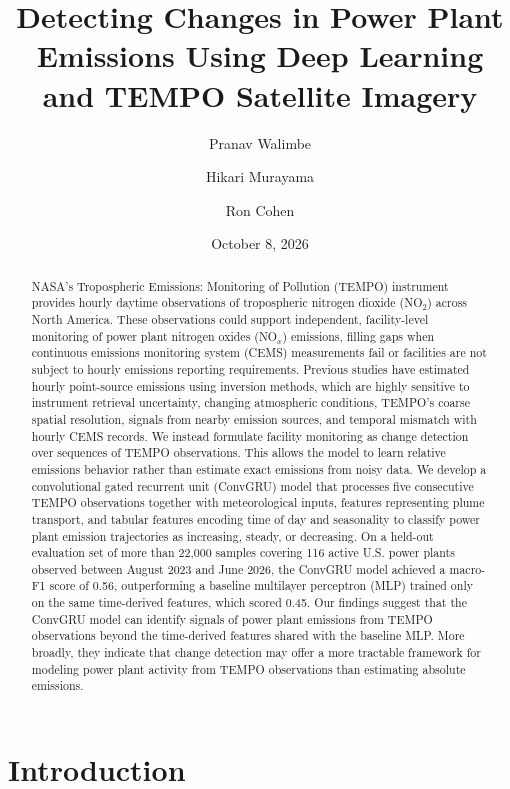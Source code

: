 \documentclass[sigconf,nonacm]{acmart}
\title{Detecting Changes in Power Plant \texorpdfstring{\NOx}{NOx} Emissions Using
Deep Learning and TEMPO Satellite Imagery}
\author{Pranav Walimbe}
\affiliation{%
  \institution{University of California, Berkeley}
  \city{Berkeley}
  \state{California}
  \country{USA}
}
\author{Hikari Murayama}
\affiliation{%
  \institution{University of California, Berkeley}
  \city{Berkeley}
  \state{California}
  \country{USA}
}
\author{Ron Cohen}
\affiliation{%
  \institution{University of California, Berkeley}
  \city{Berkeley}
  \state{California}
  \country{USA}
}
\date{October 8, 2026}
\newcommand{\NOx}{NO$_x$}
\begin{document}
\begin{abstract}
NASA's Tropospheric Emissions: Monitoring of Pollution (TEMPO) instrument
provides hourly daytime observations of tropospheric nitrogen dioxide
(NO$_2$) across North America. These observations could support independent,
facility-level monitoring of power plant nitrogen oxides (\NOx{}) emissions,
filling gaps when continuous emissions monitoring system (CEMS) measurements fail
or facilities are not subject to hourly emissions reporting requirements.
Previous studies have estimated hourly point-source emissions
using inversion methods, which are highly sensitive to instrument
retrieval uncertainty, changing atmospheric conditions, TEMPO's coarse spatial
resolution, signals from nearby emission sources, and temporal mismatch with hourly
CEMS records. We instead formulate facility monitoring as change detection over
sequences of TEMPO observations. This allows the model to learn relative emissions behavior rather
than estimate exact emissions from noisy data. We develop a convolutional gated recurrent unit (ConvGRU) model that processes five consecutive TEMPO observations
together with meteorological inputs, features representing plume transport, and tabular features encoding time of day and seasonality to
classify power plant emission trajectories as increasing, steady, or decreasing.
On a held-out evaluation set of more than 22,000 samples covering 116 active U.S. power
plants observed between August 2023 and June 2026, the ConvGRU model achieved a
macro-F1 score of 0.56, outperforming a baseline multilayer perceptron (MLP)
trained only on the same time-derived features, which scored 0.45.
Our findings suggest that the ConvGRU model can identify signals of power plant emissions
from TEMPO observations beyond the time-derived features shared with the baseline MLP. More broadly, they indicate
that change detection may offer a more tractable framework for modeling power plant activity from TEMPO observations
than estimating absolute emissions.
\end{abstract}

\maketitle

\section{Introduction}
\end{document}
